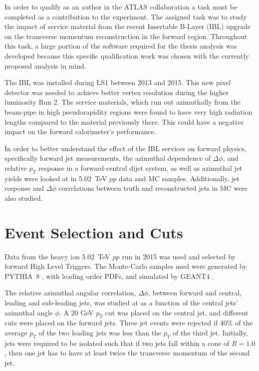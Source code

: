 
In order to qualify as an author in the ATLAS collaboration a task must be completed as a contribution to the experiment. The assigned task was to study the  impact of service material from the recent Insertable B-Layer (IBL) upgrade on the transverse momentum reconstruction in the forward region. Throughout this task, a large portion of the software required for the thesis analysis was developed because this specific qualification work was chosen with the currently proposed analysis in mind. 

The IBL was installed during LS1 between 2013 and 2015. This new pixel detector was needed to achieve better vertex resolution during the higher luminosity Run 2. The service materials, which run out azimuthally from the beam-pipe in high pseudorapidity regions were found to have very high radiation lengths compared to the material previously there. This could have a negative impact on the forward calorimeter's performance.

In order to better understand the effect of the IBL services on forward physics, specifically forward jet measurements, the azimuthal dependence of $\Delta\phi$, and relative $p_{T}$ response in a forward-central dijet system, as well as azimuthal jet yields were looked at in 5.02~TeV $pp$ data and MC samples. Additionally, jet response and $\Delta\phi$ correlations between truth and reconstructed jets in MC were also studied.

\section{Event Selection and Cuts}
Data from the heavy ion 5.02~TeV $pp$ run in 2015 was used and selected by forward High Level Triggers.
The Monte-Carlo samples used were generated by PYTHIA~8 \cite{Sjostrand:2014zea}, with leading order PDFs, and simulated by GEANT4 \cite{Agostinelli:2002hh, Aad:2010ah}.

The relative azimuthal angular correlation, $\Delta\phi$, between forward and central, leading and sub-leading jets, was studied at as a function of the central jets' azimuthal angle $\phi$. A 20 GeV $p_{T}$ cut was placed on the central jet, and different cuts were placed on the forward jets. Three jet events were rejected if $40\%$ of the average $p_{T}$ of the two leading jets was less than the $p_{T}$ of the third jet. Initially, jets were required to be isolated such that if two jets fall within a cone of $R=1.0$, then one jet has to have at least twice the transverse momentum of the second jet. 

